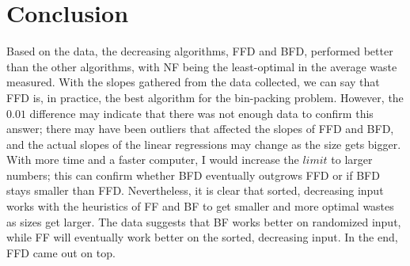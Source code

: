 \documentclass{article}
\begin{document}
\section{Conclusion}
    Based on the data, the decreasing algorithms, FFD and BFD, 
    performed better than the other algorithms, with NF being the least-optimal 
    in the average waste measured. With the slopes gathered from the data 
    collected, we can say that FFD is, in practice, the best algorithm for the 
    bin-packing problem. However, the $0.01$ difference may indicate that there 
    was not enough data to confirm this answer; there may have been outliers 
    that affected the slopes of FFD and BFD, and the actual slopes of the linear 
    regressions may change as the size gets bigger. With more time and a faster 
    computer, I would increase the $limit$ to larger numbers; this can confirm 
    whether BFD eventually outgrows FFD or if BFD stays smaller than FFD.
    \nextblurb
    Nevertheless, it is clear that sorted, decreasing input works with the
    heuristics of FF and BF to get smaller and more optimal wastes as sizes get
    larger. The data suggests that BF works better on randomized input, while 
    FF will eventually work better on the sorted, decreasing input. In the end, 
    FFD came out on top.
\end{document}
